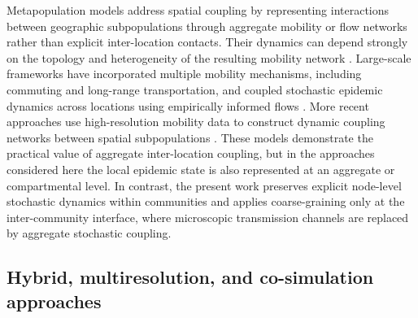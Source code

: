 \documentclass[a4paper,fleqn]{cas-sc}
\begin{document}
Metapopulation models address spatial coupling by representing interactions between geographic subpopulations through aggregate mobility or flow networks rather than explicit inter-location contacts. Their dynamics can depend strongly on the topology and heterogeneity of the resulting mobility network \cite{colizza2007reaction}. Large-scale frameworks have incorporated multiple mobility mechanisms, including commuting and long-range transportation, and coupled stochastic epidemic dynamics across locations using empirically informed flows \cite{balcan2009,balcan2010modeling}. More recent approaches use high-resolution mobility data to construct dynamic coupling networks between spatial subpopulations \cite{chang2021}. These models demonstrate the practical value of aggregate inter-location coupling, but in the approaches considered here the local epidemic state is also represented at an aggregate or compartmental level. In contrast, the present work preserves explicit node-level stochastic dynamics within communities and applies coarse-graining only at the inter-community interface, where microscopic transmission channels are replaced by aggregate stochastic coupling.

\subsection{Hybrid, multiresolution, and co-simulation approaches}
\end{document}
